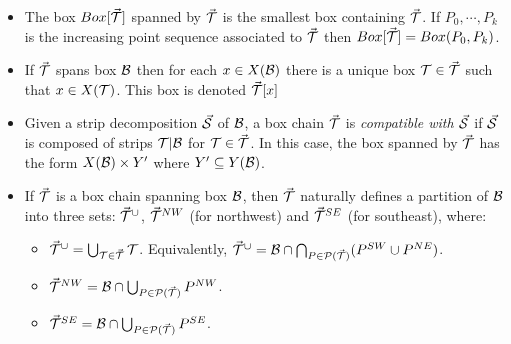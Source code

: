 \documentclass{acmsmall}
\newcommand{\cB}{{\cal B}}
\newcommand{\cC}{{\cal C}}
\newcommand{\cP}{{\cal P}}
\newcommand{\cS}{{\cal S}}
\newcommand{\cT}{{\cal T}}
\newcommand{\bx}{Box}
\newcommand{\inside}{{\tt in}}
\newcommand{\outside}{{\tt out}}
\newcommand{\In}{In}
\newcommand{\Out}{Out}
\newcommand{\strip}[2]{#1|#2}
\newcommand{\width}{{\bf {\rm  w}}}
\begin{document}
\begin{description}
\begin{itemize}
\item
The box $\bx[\vec{\cT}]$ spanned by $\vec{\cT}$ is the smallest
box containing $\vec{\cT}$.  If $P_0,\cdots,P_k$ is the increasing point sequence associated
to $\vec{\cT}$ then $\bx[\Vec{\cT}]=\bx(P_0,P_k)$.
\item If $\vec{\cT}$ spans box $\cB$ then for each $x \in X(\cB)$ there is a unique box
$\cT \in \vec{\cT}$ such that $x \in X(\cT)$.  This box is denoted $\vec{\cT}[x]$
\item
Given a strip decomposition $\vec{\cS}$ of $\cB$, a box chain
$\vec{\cT}$ is {\em compatible with $\vec{\cS}$} if $\vec{\cS}$ is composed of strips
$\strip{\cT}{\cB}$  for $\cT \in \vec{\cT}$.  In this case, the box spanned by $\vec{\cT}$
has the form $X(\cB) \times Y'$ where $Y' \subseteq Y(\cB)$.
\item  If $\vec{\cT}$ is a box chain spanning box $\cB$,
then $\vec{\cT}$ naturally defines a partition of $\cB$ into three
sets: $\vec{\cT}^{\cup}$, 
$\vec{\cT}^{NW}$ (for northwest) and $\vec{\cT}^{SE}$ (for southeast),
where:
\begin{itemize}
\item
$\vec{\cT}^{\cup}=\bigcup_{\cT \in \vec{\cT}} \cT$.  Equivalently, $\vec{\cT}^{\cup}=\cB \cap  \bigcap_{P \in \cP(\vec{\cT})} (P^{SW} \cup P^{NE})$.
\item
$\vec{\cT}^{NW}=\cB \cap \bigcup_{P \in \cP(\vec{\cT})}P^{NW}$.
\item
$\vec{\cT}^{SE}=\cB \cap \bigcup_{P \in \cP(\vec{\cT})}P^{SE}$.
\end{itemize}
\end{itemize}

\end{description}
\end{document}
